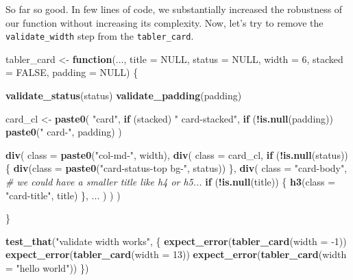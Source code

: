 \documentclass[
]{book}
\newenvironment{Shaded}{\begin{snugshade}}{\end{snugshade}}
\newcommand{\CommentTok}[1]{\textcolor[rgb]{0.56,0.35,0.01}{\textit{#1}}}
\newcommand{\ControlFlowTok}[1]{\textcolor[rgb]{0.13,0.29,0.53}{\textbf{#1}}}
\newcommand{\DataTypeTok}[1]{\textcolor[rgb]{0.13,0.29,0.53}{#1}}
\newcommand{\DecValTok}[1]{\textcolor[rgb]{0.00,0.00,0.81}{#1}}
\newcommand{\KeywordTok}[1]{\textcolor[rgb]{0.13,0.29,0.53}{\textbf{#1}}}
\newcommand{\NormalTok}[1]{#1}
\newcommand{\OperatorTok}[1]{\textcolor[rgb]{0.81,0.36,0.00}{\textbf{#1}}}
\newcommand{\OtherTok}[1]{\textcolor[rgb]{0.56,0.35,0.01}{#1}}
\newcommand{\StringTok}[1]{\textcolor[rgb]{0.31,0.60,0.02}{#1}}
\begin{document}
So far so good. In few lines of code, we substantially increased the robustness of our function without increasing its complexity. Now, let's try to remove the \texttt{validate\_width} step from the \texttt{tabler\_card}.

\begin{Shaded}
\begin{Highlighting}[]
\NormalTok{tabler_card <-}\StringTok{ }\ControlFlowTok{function}\NormalTok{(..., }\DataTypeTok{title =} \OtherTok{NULL}\NormalTok{, }\DataTypeTok{status =} \OtherTok{NULL}\NormalTok{, }\DataTypeTok{width =} \DecValTok{6}\NormalTok{, }\DataTypeTok{stacked =} \OtherTok{FALSE}\NormalTok{, }\DataTypeTok{padding =} \OtherTok{NULL}\NormalTok{) \{}
  
  \KeywordTok{validate_status}\NormalTok{(status)}
  \KeywordTok{validate_padding}\NormalTok{(padding)}
  
\NormalTok{  card_cl <-}\StringTok{ }\KeywordTok{paste0}\NormalTok{(}
    \StringTok{"card"}\NormalTok{, }
    \ControlFlowTok{if}\NormalTok{ (stacked) }\StringTok{" card-stacked"}\NormalTok{,}
    \ControlFlowTok{if}\NormalTok{ (}\OperatorTok{!}\KeywordTok{is.null}\NormalTok{(padding)) }\KeywordTok{paste0}\NormalTok{(}\StringTok{" card-"}\NormalTok{, padding)}
\NormalTok{  )}
  
  \KeywordTok{div}\NormalTok{(}
    \DataTypeTok{class =} \KeywordTok{paste0}\NormalTok{(}\StringTok{"col-md-"}\NormalTok{, width),}
    \KeywordTok{div}\NormalTok{(}
      \DataTypeTok{class =}\NormalTok{ card_cl,}
      \ControlFlowTok{if}\NormalTok{ (}\OperatorTok{!}\KeywordTok{is.null}\NormalTok{(status)) \{}
        \KeywordTok{div}\NormalTok{(}\DataTypeTok{class =} \KeywordTok{paste0}\NormalTok{(}\StringTok{"card-status-top bg-"}\NormalTok{, status))}
\NormalTok{      \},}
      \KeywordTok{div}\NormalTok{(}
        \DataTypeTok{class =} \StringTok{"card-body"}\NormalTok{,}
        \CommentTok{# we could have a smaller title like h4 or h5...}
        \ControlFlowTok{if}\NormalTok{ (}\OperatorTok{!}\KeywordTok{is.null}\NormalTok{(title)) \{}
          \KeywordTok{h3}\NormalTok{(}\DataTypeTok{class =} \StringTok{"card-title"}\NormalTok{, title)}
\NormalTok{        \},}
\NormalTok{        ...}
\NormalTok{      )}
\NormalTok{    )}
\NormalTok{  )}
  
\NormalTok{\}}


\KeywordTok{test_that}\NormalTok{(}\StringTok{"validate width works"}\NormalTok{, \{}
  \KeywordTok{expect_error}\NormalTok{(}\KeywordTok{tabler_card}\NormalTok{(}\DataTypeTok{width =} \DecValTok{-1}\NormalTok{))}
  \KeywordTok{expect_error}\NormalTok{(}\KeywordTok{tabler_card}\NormalTok{(}\DataTypeTok{width =} \DecValTok{13}\NormalTok{))}
  \KeywordTok{expect_error}\NormalTok{(}\KeywordTok{tabler_card}\NormalTok{(}\DataTypeTok{width =} \StringTok{"hello world"}\NormalTok{))}
\NormalTok{\})}
\end{Highlighting}
\end{Shaded}
\end{document}
